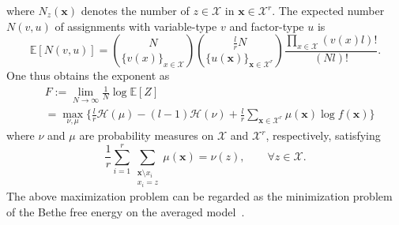 \documentclass[conference,twocolumns]{IEEEtran}
\theoremstyle{plain}
\begin{document}
where $N_z(\bm{x})$ denotes the number of $z\in\mathcal{X}$ in $\bm{x}\in\mathcal{X}^r$.
The expected number $N(v,u)$ of assignments with variable-type $v$ and factor-type $u$ is
\begin{equation*}
\mathbb{E}[N(v,u)]
=
\binom{N}{\{v(x)\}_{x\in\mathcal{X}}}
\binom{\frac{l}{r}N}{\{u(\bm{x})\}_{\bm{x}\in\mathcal{X}^r}}
\frac{\prod_{x\in\mathcal{X}}
(v(x)l)!}{(Nl)!}.
\end{equation*}
One thus obtains the exponent as 
\begin{align}
&F:=\lim_{N\to\infty} \frac1N \log \mathbb{E}[Z]\nonumber\\
&=\max_{\nu,\mu}\bigg\{
\frac{l}{r}\mathcal{H}(\mu) - (l-1)\mathcal{H}(\nu)
+\frac{l}{r}\sum_{\bm{x}\in\mathcal{X}^r} \mu(\bm{x})\log f(\bm{x})\bigg\}
\label{eq:max}
\end{align}
where $\nu$ and $\mu$ are probability measures on $\mathcal{X}$ and $\mathcal{X}^r$, respectively, satisfying
\begin{equation*}
\frac1{r}\sum_{i=1}^r\sum_{\substack{\bm{x}\setminus x_i\\ x_i=z}}\mu(\bm{x}) = \nu(z),\hspace{2em}\forall z\in\mathcal{X}.
\end{equation*}
The above maximization problem can be regarded as the minimization problem of the Bethe free energy on the averaged model~\cite{mori2011connection}.
\end{document}
